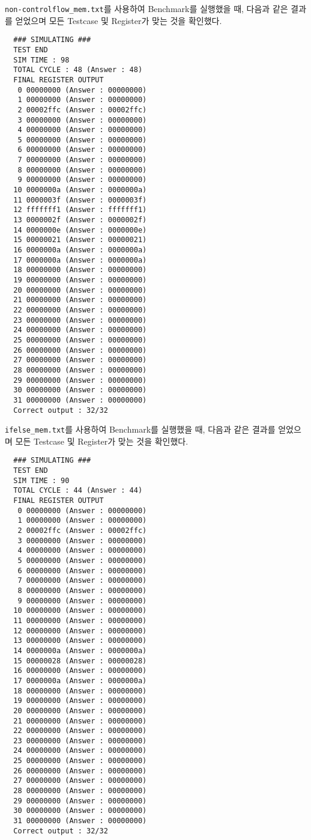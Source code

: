 \documentclass{scrartcl}
\begin{document}
\texttt{non-controlflow\_mem.txt}를 사용하여 Benchmark를 실행했을 때, 다음과 같은 결과를 얻었으며 모든 Testcase 및 Register가 맞는 것을 확인했다.
\begin{lstlisting}
  ### SIMULATING ###
  TEST END
  SIM TIME : 98
  TOTAL CYCLE : 48 (Answer : 48)
  FINAL REGISTER OUTPUT
   0 00000000 (Answer : 00000000)
   1 00000000 (Answer : 00000000)
   2 00002ffc (Answer : 00002ffc)
   3 00000000 (Answer : 00000000)
   4 00000000 (Answer : 00000000)
   5 00000000 (Answer : 00000000)
   6 00000000 (Answer : 00000000)
   7 00000000 (Answer : 00000000)
   8 00000000 (Answer : 00000000)
   9 00000000 (Answer : 00000000)
  10 0000000a (Answer : 0000000a)
  11 0000003f (Answer : 0000003f)
  12 fffffff1 (Answer : fffffff1)
  13 0000002f (Answer : 0000002f)
  14 0000000e (Answer : 0000000e)
  15 00000021 (Answer : 00000021)
  16 0000000a (Answer : 0000000a)
  17 0000000a (Answer : 0000000a)
  18 00000000 (Answer : 00000000)
  19 00000000 (Answer : 00000000)
  20 00000000 (Answer : 00000000)
  21 00000000 (Answer : 00000000)
  22 00000000 (Answer : 00000000)
  23 00000000 (Answer : 00000000)
  24 00000000 (Answer : 00000000)
  25 00000000 (Answer : 00000000)
  26 00000000 (Answer : 00000000)
  27 00000000 (Answer : 00000000)
  28 00000000 (Answer : 00000000)
  29 00000000 (Answer : 00000000)
  30 00000000 (Answer : 00000000)
  31 00000000 (Answer : 00000000)
  Correct output : 32/32
\end{lstlisting}

\texttt{ifelse\_mem.txt}를 사용하여 Benchmark를 실행했을 때, 다음과 같은 결과를 얻었으며 모든 Testcase 및 Register가 맞는 것을 확인했다.
\begin{lstlisting}
  ### SIMULATING ###
  TEST END
  SIM TIME : 90
  TOTAL CYCLE : 44 (Answer : 44)
  FINAL REGISTER OUTPUT
   0 00000000 (Answer : 00000000)
   1 00000000 (Answer : 00000000)
   2 00002ffc (Answer : 00002ffc)
   3 00000000 (Answer : 00000000)
   4 00000000 (Answer : 00000000)
   5 00000000 (Answer : 00000000)
   6 00000000 (Answer : 00000000)
   7 00000000 (Answer : 00000000)
   8 00000000 (Answer : 00000000)
   9 00000000 (Answer : 00000000)
  10 00000000 (Answer : 00000000)
  11 00000000 (Answer : 00000000)
  12 00000000 (Answer : 00000000)
  13 00000000 (Answer : 00000000)
  14 0000000a (Answer : 0000000a)
  15 00000028 (Answer : 00000028)
  16 00000000 (Answer : 00000000)
  17 0000000a (Answer : 0000000a)
  18 00000000 (Answer : 00000000)
  19 00000000 (Answer : 00000000)
  20 00000000 (Answer : 00000000)
  21 00000000 (Answer : 00000000)
  22 00000000 (Answer : 00000000)
  23 00000000 (Answer : 00000000)
  24 00000000 (Answer : 00000000)
  25 00000000 (Answer : 00000000)
  26 00000000 (Answer : 00000000)
  27 00000000 (Answer : 00000000)
  28 00000000 (Answer : 00000000)
  29 00000000 (Answer : 00000000)
  30 00000000 (Answer : 00000000)
  31 00000000 (Answer : 00000000)
  Correct output : 32/32
\end{lstlisting}
\end{document}
